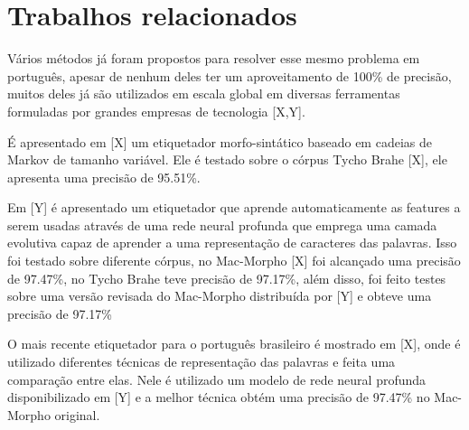 \chapter{Trabalhos relacionados}\label{trabalhosrelacionados}

Vários métodos já foram propostos para resolver esse mesmo problema em português, apesar de nenhum deles ter um aproveitamento de 100\% de precisão, muitos deles já são utilizados em escala global em diversas ferramentas formuladas por grandes empresas de tecnologia [X,Y].

É apresentado em [X] um etiquetador morfo-sintático baseado em cadeias de Markov de tamanho variável. Ele é testado sobre o córpus Tycho Brahe [X], ele apresenta uma precisão de 95.51\%. 

Em [Y] é apresentado um etiquetador que aprende automaticamente as features a serem usadas através de uma rede neural profunda que emprega uma camada evolutiva capaz de aprender a uma representação de caracteres das palavras. Isso foi testado sobre diferente córpus, no Mac-Morpho [X] foi alcançado uma precisão de 97.47\%, no Tycho Brahe teve precisão de 97.17\%, além disso, foi feito testes sobre uma versão revisada do Mac-Morpho distribuída por [Y] e obteve uma precisão de 97.17\%

O mais recente etiquetador para o português brasileiro é mostrado em [X], onde é utilizado diferentes técnicas de representação das palavras e feita uma comparação entre elas. Nele é utilizado um modelo de rede neural profunda disponibilizado em [Y] e a melhor técnica obtém uma precisão de 97.47\% no Mac-Morpho original.